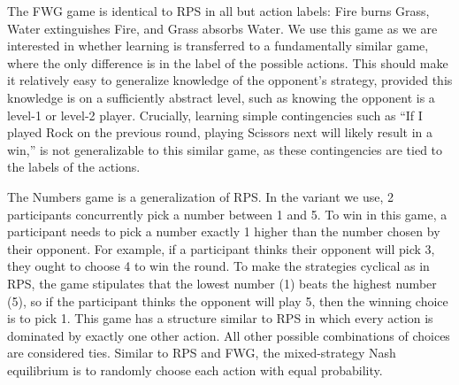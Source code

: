 \documentclass[smallextended]{svjour3}       %
\begin{document}
The FWG game is identical to RPS in all but action labels: Fire burns
Grass, Water extinguishes Fire, and Grass absorbs Water. We use this
game as we are interested in whether learning is transferred to a
fundamentally similar game, where the only difference is in the label of
the possible actions. This should make it relatively easy to generalize
knowledge of the opponent's strategy, provided this knowledge is on a
sufficiently abstract level, such as knowing the opponent is a level-1
or level-2 player. Crucially, learning simple contingencies such as ``If
I played Rock on the previous round, playing Scissors next will likely
result in a win,'' is not generalizable to this similar game, as these
contingencies are tied to the labels of the actions.

The Numbers game is a generalization of RPS. In the variant we use, 2
participants concurrently pick a number between 1 and 5. To win in this
game, a participant needs to pick a number exactly 1 higher than the
number chosen by their opponent. For example, if a participant thinks
their opponent will pick 3, they ought to choose 4 to win the round. To
make the strategies cyclical as in RPS, the game stipulates that the
lowest number (1) beats the highest number (5), so if the participant
thinks the opponent will play 5, then the winning choice is to pick 1.
This game has a structure similar to RPS in which every action is
dominated by exactly one other action. All other possible combinations
of choices are considered ties. Similar to RPS and FWG, the
mixed-strategy Nash equilibrium is to randomly choose each action with
equal probability.
\end{document}
